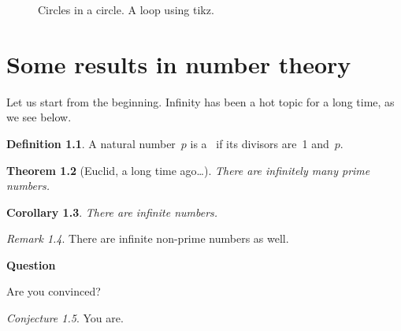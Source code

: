\documentclass[11pt,oneside,article,extrafontsizes]{memoir}
\newtheorem{theorem}{Theorem}[chapter]
\newtheorem{corollary}[theorem]{Corollary}
\theoremstyle{definition}
\newtheorem{definition}[theorem]{Definition}
\theoremstyle{remark}
\newtheorem{remark}[theorem]{Remark}
\newtheorem{conjecture}[theorem]{Conjecture}
\newenvironment{question}{%
  \par\smallskip\noindent\textbf{Question} \ignorespaces%
 }{%
  \par\smallskip}
\begin{document}
\begin{figure}
  \begin{center}
    \caption{Circles in a circle. A loop using tikz.}\label{fig:tikz}
  \end{center}
\end{figure}

\chapter{Some results in number theory}

Let us start from the beginning.
Infinity has been a hot topic for a long time,
as we see below.

\begin{definition}
  A natural number~$p$ is a~ if its divisors are~1 and~$p$.
\end{definition}

\begin{theorem}[Euclid, a long time ago\ldots]
  There are infinitely many prime numbers.
\end{theorem}

\begin{corollary}
  There are infinite numbers.
\end{corollary}

\begin{remark}
  There are infinite non-prime numbers as well.
\end{remark}

\begin{question}
Are you convinced?
\end{question}

\begin{conjecture}
  You are.
\end{conjecture}
\end{document}
